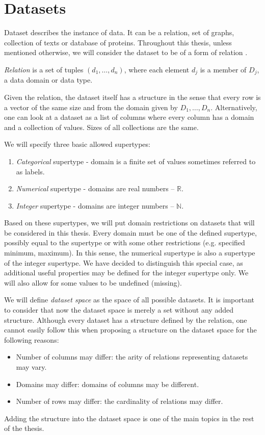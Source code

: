 \section{Datasets}
\label{section:datasets}
Dataset describes the instance of data. It can be a relation, set of graphs, collection of texts or database of proteins. Throughout this thesis, unless mentioned otherwise, we will consider the dataset to be of a form of relation \cite{dbRelation}.

\begin{definition}
	\emph{Relation} is a set of tuples $(d_1, \dots, d_n)$, where each element $d_j$ is a member of $D_j$, a data domain or data type.
\end{definition}

Given the relation, the dataset itself has a structure in the sense that every row is a vector of the same size and from the domain given by $D_1, \dots , D_n$. Alternatively, one can look at a dataset as a list of columns where every column has a domain and a collection of values. Sizes of all collections are the same.

We will specify three basic allowed supertypes:
\begin{enumerate}
	\item \emph{Categorical} supertype - domain is a finite set of values sometimes referred to as labels.
	\item \emph{Numerical} supertype - domains are real numbers -- $\mathbb{R}$.
	\item \emph{Integer} supertype - domains are integer numbers -- $\mathbb{N}$.
\end{enumerate}
Based on these supertypes, we will put domain restrictions on datasets that will be considered in this thesis. Every domain must be one of the defined supertype, possibly equal to the supertype or with some other restrictions (e.g. specified minimum, maximum). In this sense, the numerical supertype is also a supertype of the integer supertype. We have decided to distinguish this special case, as additional useful properties may be defined for the integer supertype only. We will also allow for some values to be undefined (missing).

We will define \emph{dataset space} as the space of all possible datasets. It is important to consider that now the dataset space is merely a set
without any added structure. Although every dataset has a structure defined by the relation, one cannot easily follow this when proposing a structure on the dataset space for the following reasons:
\begin{itemize}
	\item Number of columns may differ: the arity of relations representing datasets may vary. 
	\item Domains may differ: domains of columns may be different.
	\item Number of rows may differ: the cardinality of relations may differ.
\end{itemize}
Adding the structure into the dataset space is one of the main topics in the rest of the thesis.

